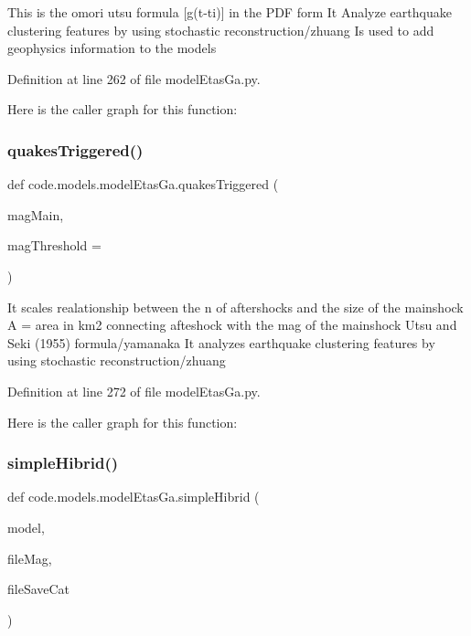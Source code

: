 \begin{DoxyVerb}This is the omori utsu formula [g(t-ti)] in the PDF form
It Analyze earthquake clustering features by using stochastic reconstruction/zhuang
Is used to add geophysics information to the models
\end{DoxyVerb}
 

Definition at line 262 of file model\+Etas\+Ga.\+py.

Here is the caller graph for this function\+:
\mbox{\label{namespacecode_1_1models_1_1model_etas_ga_a7692aca39690ae67f96a2ba603e5f23c}} 
\subsubsection{\texorpdfstring{quakes\+Triggered()}{quakesTriggered()}}
{\footnotesize\ttfamily def code.\+models.\+model\+Etas\+Ga.\+quakes\+Triggered (\begin{DoxyParamCaption}\item[{}]{mag\+Main,  }\item[{}]{mag\+Threshold = {} }\end{DoxyParamCaption})}

\begin{DoxyVerb}It scales realationship between the n of aftershocks and the size of the mainshock
A = area in km2 connecting afteshock with the mag of the mainshock
Utsu and Seki (1955) formula/yamanaka
It analyzes earthquake clustering features by using stochastic reconstruction/zhuang
\end{DoxyVerb}
 

Definition at line 272 of file model\+Etas\+Ga.\+py.

Here is the caller graph for this function\+:
\mbox{\label{namespacecode_1_1models_1_1model_etas_ga_a99b0b810e490c2d38b6cb198e87b85d3}} 
\subsubsection{\texorpdfstring{simple\+Hibrid()}{simpleHibrid()}}
{\footnotesize\ttfamily def code.\+models.\+model\+Etas\+Ga.\+simple\+Hibrid (\begin{DoxyParamCaption}\item[{}]{model,  }\item[{}]{file\+Mag,  }\item[{}]{file\+Save\+Cat }\end{DoxyParamCaption})}

